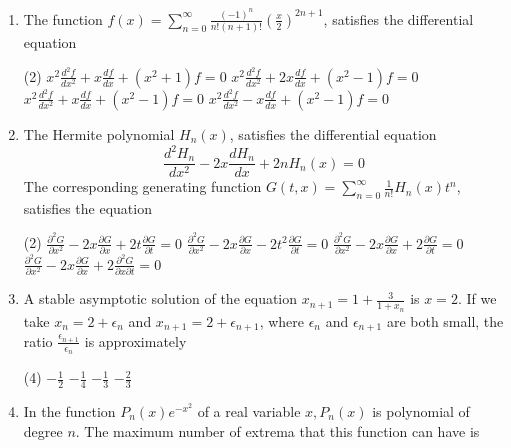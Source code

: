 \begin{enumerate}[label=\color{ocre}\textbf{\arabic*.}]
	{}
	\begin{tasks}(4)
		\task[\textbf{A.}] $0.26$
		\task[\textbf{C.}] $0.5$
		\task[\textbf{D.}] $-1$
	\end{tasks}
	\item The function $f(x)=\sum_{n=0}^{\infty} \frac{(-1)^{n}}{n !(n+1) !}\left(\frac{x}{2}\right)^{2 n+1}$, satisfies the differential equation
	{}
	\begin{tasks}(2)
		\task[\textbf{A.}]  $x^{2} \frac{d^{2} f}{d x^{2}}+x \frac{d f}{d x}+\left(x^{2}+1\right) f=0$
		\task[\textbf{B.}]  $x^{2} \frac{d^{2} f}{d x^{2}}+2 x \frac{d f}{d x}+\left(x^{2}-1\right) f=0$
		\task[\textbf{C.}] $x^{2} \frac{d^{2} f}{d x^{2}}+x \frac{d f}{d x}+\left(x^{2}-1\right) f=0$
		\task[\textbf{D.}] $x^{2} \frac{d^{2} f}{d x^{2}}-x \frac{d f}{d x}+\left(x^{2}-1\right) f=0$
	\end{tasks}
	\item
	 The Hermite polynomial $H_{n}(x)$, satisfies the differential equation
	$$
	\frac{d^{2} H_{n}}{d x^{2}}-2 x \frac{d H_{n}}{d x}+2 n H_{n}(x)=0
	$$
	The corresponding generating function $G(t, x)=\sum_{n=0}^{\infty} \frac{1}{n !} H_{n}(x) t^{n}$, satisfies the equation
	{}
	\begin{tasks}(2)
		\task[\textbf{A.}] $\frac{\partial^{2} G}{\partial x^{2}}-2 x \frac{\partial G}{\partial x}+2 t \frac{\partial G}{\partial t}=0$
		\task[\textbf{B.}] $\frac{\partial^{2} G}{\partial x^{2}}-2 x \frac{\partial G}{\partial x}-2 t^{2} \frac{\partial G}{\partial t}=0$
		\task[\textbf{C.}] $\frac{\partial^{2} G}{\partial x^{2}}-2 x \frac{\partial G}{\partial x}+2 \frac{\partial G}{\partial t}=0$
		\task[\textbf{D.}]  $\frac{\partial^{2} G}{\partial x^{2}}-2 x \frac{\partial G}{\partial x}+2 \frac{\partial^{2} G}{\partial x \partial t}=0$
	\end{tasks}
	\item A stable asymptotic solution of the equation $x_{n+1}=1+\frac{3}{1+x_{n}}$ is $x=2$. If we take $x_{n}=2+\epsilon_{n}$ and $x_{n+1}=2+\epsilon_{n+1}$, where $\epsilon_{n}$ and $\epsilon_{n+1}$ are both small, the ratio $\frac{\epsilon_{n+1}}{\epsilon_{n}}$ is approximately
	{}
	\begin{tasks}(4)
		\task[\textbf{A.}] $-\frac{1}{2}$
		\task[\textbf{B.}] $-\frac{1}{4}$
		\task[\textbf{C.}]  $-\frac{1}{3}$
		\task[\textbf{D.}] $-\frac{2}{3}$
	\end{tasks}
	\item In the function $P_{n}(x) e^{-x^{2}}$ of a real variable $x, P_{n}(x)$ is polynomial of degree $n$. The maximum number of extrema that this function can have is

\end{enumerate}
